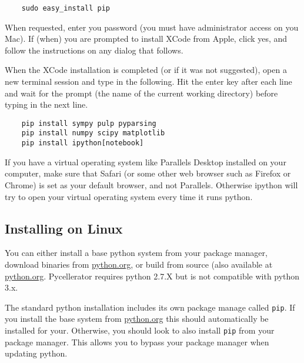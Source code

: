 \begin{lstlisting}
    sudo easy_install pip
\end{lstlisting}

When requested, enter you password (you must have administrator access on you Mac). If (when) you are prompted to install XCode from Apple, click yes, and follow the instructions on any dialog that follows. 

When the XCode installation is completed (or if it was not suggested), open a new terminal session and type in the following. Hit the enter key after each line and wait for the prompt (the name of the current working directory) before typing in the next line. 

\begin{lstlisting}
    pip install sympy pulp pyparsing
    pip install numpy scipy matplotlib
    pip install ipython[notebook]
\end{lstlisting}

If you have a virtual operating system like Parallels Desktop installed on your computer, make sure that Safari (or some other web browser such as Firefox or Chrome) is set as your default browser, and not Parallels. Otherwise ipython will try to open your virtual operating system every time it runs python. 


\subsection{Installing on Linux}

You can either install a base python system from your package manager, download binaries from \href{python.org}{python.org}, or build from source (also available at \href{python.org}{python.org}. Pycellerator requires python 2.7.X but is not compatible with python 3.x. 

The standard python installation includes its own package manage called {\tt pip}. If you install the base system from 
\href{python.org}{python.org} this should automatically be installed for your. Otherwise, you should look to also install {\tt pip} from your package manager. This allows you to bypass your package manager when updating python.

